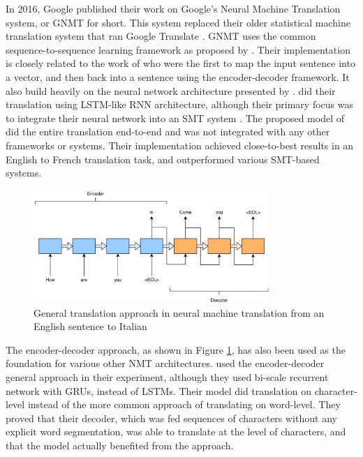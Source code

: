 In 2016, Google published their work on Google's Neural Machine Translation system, or GNMT for short. This system replaced their older statistical machine translation system that ran Google Translate \citep{turovsky2016googletranslatenmt}. GNMT uses the common sequence-to-sequence learning framework as proposed by \cite{sutskever2014sequence, wu2016google}. Their implementation is closely related to the work of \cite{kalchbrenner2013recurrent} who were the first to map the input sentence into a vector, and then back into a sentence using the encoder-decoder framework. It also build heavily on the neural network architecture presented by \cite{cho2014learning}. \cite{cho2014learning} did their translation using LSTM-like RNN architecture, although their primary focus was to integrate their neural network into an SMT system \citep{cho2014learning, sutskever2014sequence}. The proposed model of \cite{sutskever2014sequence} did the entire translation end-to-end and was not integrated with any other frameworks or systems. Their implementation achieved close-to-best results in an English to French translation task, and outperformed various SMT-based systems.

\begin{figure}[ht]
    \centering
    \includegraphics[width=0.8\textwidth]{fig/related_work/encoder_decoder_en_it.png}
    \captionsetup{justification=centering}
    \caption{General translation approach in neural machine translation from an English sentence to Italian}
    \label{fig:machine-translation-encoder-decoder-simple}
\end{figure}

The encoder-decoder approach, as shown in Figure \ref{fig:machine-translation-encoder-decoder-simple}, has also been used as the foundation for various other NMT architectures. \cite{chung2016character} used the encoder-decoder general approach in their experiment, although they used bi-scale recurrent network with GRUs, instead of LSTMs. Their model did translation on character-level instead of the more common approach of translating on word-level. They proved that their decoder, which was fed sequences of characters without any explicit word segmentation, was able to translate at the level of characters, and that the model actually benefited from the approach. 

